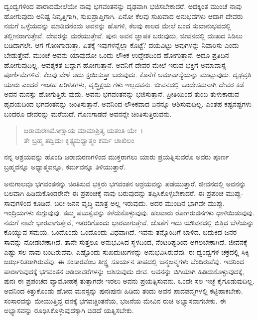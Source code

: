 ದ್ವಂದ್ವಗಳಿಂದ ಪಾರಾದಮೇಲೆಯೇ ನಾವು ಭಗವಂತನನ್ನು ದೃಢವಾಗಿ ಭಜಿಸಬೇಕಾದರೆ. ಅದಕ್ಕಿಂತ ಮುಂಚೆ ನಾವು ಹೋಗುವುದು ಅನಿಷ್ಟ ನಿವೃತ್ತಿಗಾಗಿ, ಸುಖಪ್ರಾಪ್ತಿಗಾಗಿ. ಏನೋ ಕೆಲವು ಸುಖವಾದ ಅನುಭವಗಳು ಆದಾಗ ದೇವರು ನಮಗೆ ಒಳ್ಳೆಯದನ್ನು ಮಾಡಿದನೆಂದು ಅವನನ್ನು ಹೊಗಳಿ, ಕೆಲವು ಕಾಲದ ಮೇಲೆ ಬಂದ ಸುಖಾನುಭವದಲ್ಲಿ ತಲ್ಲೀನರಾಗುತ್ತೇವೆ. ದೇವರನ್ನು ಮರೆಯುತ್ತೇವೆ. ಪುನಃ ಅವನ ಜ್ಞಾಪಕ ಬರುವುದು, ಜೀವನದಲ್ಲಿ ದುಃಖದ ಸಿಡಿಲು ಬಡಿದಾಗಲೇ. ಆಗ ಗೊಣಗಾಡುತ್ತಾ, ಏತಕ್ಕೆ ಇವುಗಳನ್ನೆಲ್ಲಾ ಕೊಟ್ಟೆ? ದಯವಿಟ್ಟು ಅವುಗಳನ್ನು ನಿವಾರಿಸು ಎಂದು ಬೇಡುತ್ತೇವೆ. ಮುಂಚೆ ಅವನು ಯಾವುದೋ ಒಂದು ಲೌಕಿಕ ಉದ್ದೇಶದಿಂದ ಹೋಗುತ್ತಾನೆ. ಅದೂ ಪ್ರತಿದಿನ ಹೋಗುವುದಿಲ್ಲ. ಆವಶ್ಯಕತೆ ಬಿದ್ದಾಗ ಹೋಗುತ್ತಾನೆ. ಅವನಿಗೆ ದೇವರ ಮೇಲೆ ಇರುವ ಭಕ್ತಿಗೆ ಅಮಾವಾಸ್ಯೆ ಪೂರ್ಣಿಮೆಗಳಿವೆ. ಕೆಲವು ವೇಳೆ ಅದು ಕ್ಷಯಿಸುತ್ತಾ ಬರುವುದು. ಕೊನೆಗೆ ಅಮಾವಾಸ್ಯೆಯನ್ನು ಮುಟ್ಟುವುದು. ದೃಢವ್ರತಿ ಯಾರು ಎಂದರೆ ಇಂತಹ ಏರಿಳಿತಗಳು, ವೃದ್ಧಿಕ್ಷಯ ಗಳು ಇಲ್ಲದವನು. ಜೀವನದಲ್ಲಿ ಒಂದೇಸಮನಾಗಿ ದೇವರ ಕಡೆ ಅವನ ಮನಸ್ಸು ಹೋಗುತ್ತಿರು ವುದು. ಅವನು ಭಗವಂತನನ್ನು ಭಜಿಸುತ್ತಾನೆ. ಪ್ರೀತಿಯಿಂದ ತುಂಬಿ ತುಳುಕಾಡುವ ಹೃದಯದಿಂದ ಭಗವಂತನನ್ನು ಚಿಂತಿಸುತ್ತಾನೆ. ಅವನಿಂದ ಲೌಕಿಕವಾದ ಏನನ್ನೂ ಆಶಿಸುವುದಿಲ್ಲ. ಎಂತಹ ಕಷ್ಟನಷ್ಟಗಳು ಬಂದರೂ ದೇವರನ್ನು ಮರೆಯದೆ, ಗೊಣಗಾಡದೆ ಅವನನ್ನೇ ಚಿಂತಿಸುತ್ತಿರುವನು.

\begin{verse}
ಜರಾಮರಣಮೋಕ್ಷಾಯ ಮಾಮಾಶ್ರಿತ್ಯ ಯತಂತಿ ಯೇ~।\\ತೇ ಬ್ರಹ್ಮ ತದ್ವಿದುಃ ಕೃತ್ಸ್ನಮಧ್ಯಾತ್ಮಂ ಕರ್ಮ ಚಾಖಿಲಂ 
\end{verse}

{\small ನನ್ನ ಆಶ್ರಯವನ್ನು ಹೊಂದಿ ಜರಾಮರಣಗಳಿಂದ ಮುಕ್ತರಾಗಲು ಯಾರು ಪ್ರಯತ್ನಿಸುವರೊ ಅವರು ಪೂರ್ಣ ಬ್ರಹ್ಮವನ್ನೂ ಅಧ್ಯಾತ್ಮವನ್ನೂ, ಕರ್ಮವನ್ನೂ ತಿಳಿಯುತ್ತಾರೆ.}

ಅನುಗಾಲವೂ ಭಗವಂತನನ್ನು ಚಿಂತಿಸುವ ಭಕ್ತರು ಭಗವಂತನ ಆಶ್ರಯವನ್ನು ಪಡೆಯುತ್ತಾರೆ. ಜೀವನದಲ್ಲಿ ಅವನನ್ನು ಬಲವಾಗಿ ಹಿಡಿದುಕೊಂಡರೇನೇ ಈ ಪ್ರಪಂಚಕ್ಕೆ ನಾವು ಬರುವುದನ್ನು ತಪ್ಪಿಸಿಕೊಳ್ಳಬೇಕಾದರೆ. ಈ ಪ್ರಪಂಚ ಮುಪ್ಪು-ಸಾವುಗಳಿಂದ ಕೂಡಿದೆ. ಬರೀ ಜನನ ವೃದ್ಧಿ ಮಾತ್ರ ಅಲ್ಲ ಇರುವುದು. ಅದರ ಮುಂದಿನ ಭಾಗವೇ ಮುಪ್ಪು. ಇಂದ್ರಿಯಗಳು ಕುಗ್ಗುವುವು. ತಮ್ಮ ಪಟುತ್ವವನ್ನು ಕಳೆದುಕೊಳ್ಳುವುವು. ಹಲವಾರು ರೋಗರುಜಿನಗಳು ಧಾಳಿಯಿಡುವುವು. ನಮಗೆ ನಾವೇ ಭಾರವಾಗುತ್ತೇವೆ, ಇತರರಿಗೊಂದು ಭಾರವಾಗುತ್ತೇವೆ. ಜೊತೆಗೆ ಇದು ಯೌವನದಲ್ಲಿ ಬಿತ್ತಿದ ಬೆಳೆಯನ್ನು ಕೊಯ್ಯುವ ಸಮಯ. ಒಂದೊಂದು ಒಂದೊಂದು ವಿಧವಾಗಿದೆ. ಇವನು ತನ್ನೊಂದಿಗೆ ಬಾಳಿದ, ಬದುಕಿದ ಜನರ ಸಾವನ್ನು ನೋಡಬೇಕಾಗಿದೆ. ತಾನೇ ಸುತ್ತಲೂ ಅನುಭವಿಸಿದ ಸ್ಥಳದಿಂದ, ನೆಂಟರಿಷ್ಟರಿಂದ ಅಗಲಬೇಕಾಗಿದೆ. ಜೀವನಕ್ಕೆ ಎಷ್ಟು ಸಲ ನಾವು ಬಂದಿರುವೆವು, ಎಷ್ಟೊಂದು ಸುಖದುಃಖಗಳನ್ನು ಅನುಭವಿಸಿರುವೆವು. ಈ ದ್ವಂದ್ವಗಳ ಚಕ್ರದಲ್ಲಿ ಸಿಕ್ಕಿ ಜರ್ಝರಿತರಾಗಿರುವೆವು. ಈ ಸಂಸಾರವೆಂಬ ತೀಕ್ಷ್ಣ ಸೂರ್ಯನ ತಾಪದಲ್ಲಿ ಜನ್ಮಜನ್ಮಗಳು ಬೆಂದಿರುವೆವು. ಇದರಿಂದ ಪಾರಾಗುವುದಕ್ಕೆ ಭಗವಂತನ ಅಡಿದಾವರೆಗಳನ್ನು ಆಶಿಸುವುದು ಜೀವ. ಅವನನ್ನು ಬಿಗಿಯಾಗಿ ಹಿಡಿದುಕೊಳ್ಳುವುದಕ್ಕೆ, ಪುನಃ ಈ ಪ್ರಪಂಚದ ವ್ಯಾಮೋಹಕ್ಕೆ ತುತ್ತಾಗದೇ ಇರಲು ಅವನು ಪ್ರಯತ್ನಿಸುವನು. ಒಂದೇ ಸಲ ಇಚ್ಛೆ ಕೈಗೂಡುವುದಿಲ್ಲ. ಅವನಿಂದ ಕಿತ್ತುಕೊಂಡು ಹೋದ ಮನಸ್ಸನ್ನು ಪುನಃಪುನಃ ಹಿಡಿದು ತಂದು ಅವನ ಪಾದಪದ್ಮಗಳಲ್ಲಿ ಕಟ್ಟಿಹಾಕಬೇಕು. ಸಂಸಾರವನ್ನು ಮೇಯುತ್ತಿದ್ದ ದನಕ್ಕೆ ಭಗವಚ್ಚಿಂತನೆಯ, ಭಜನೆಯ ಮೇವಿನ ರುಚಿ ಅಭ್ಯಾಸವಾಗಬೇಕು. ಈ ಅಭ್ಯಾಸವನ್ನು ರೂಢಿಸಿಕೊಳ್ಳುವುದಕ್ಕಾಗಿ ಬಿಡದೆ ಯತ್ನಿಸಬೇಕು.

